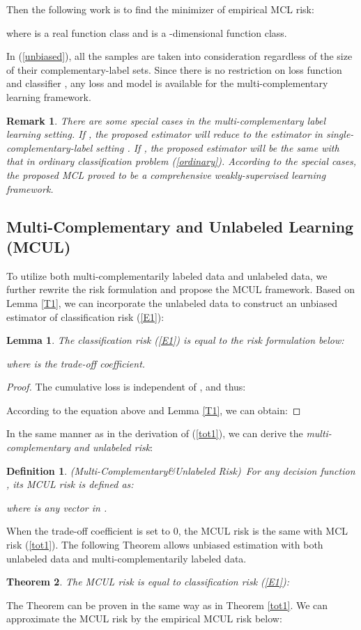 \documentclass[]{article} \usepackage{geometry}
\newtheorem{definition}{Definition}
\newtheorem{theorem}{Theorem}
\newtheorem{remark}{Remark}
\newtheorem{lemma}[theorem]{Lemma}
\begin{document}
Then the following work is to find the minimizer  of empirical MCL risk:

where  is a real function class and  is a -dimensional function class.

In (\ref{unbiased}), all the samples are taken into consideration regardless of the size of their complementary-label sets. Since there is no restriction on loss function  and classifier , any loss and model is available for the multi-complementary learning framework.

\begin{remark}{\rm
There are some special cases in the multi-complementary label learning setting. If , the proposed estimator will reduce to the estimator in single-complementary-label setting \cite{DBLP:conf/icml/IshidaNMS19}. If , the proposed estimator will be the same with that in ordinary classification problem (\ref{ordinary}). According to the special cases, the proposed MCL proved to be a comprehensive weakly-supervised learning framework.}
\end{remark}
\subsection{Multi-Complementary and Unlabeled Learning (MCUL)}
To utilize both multi-complementarily labeled data and unlabeled data, we further rewrite the risk formulation and propose the MCUL framework. Based on Lemma \ref{T1}, we can incorporate the unlabeled data to construct an unbiased estimator of classification risk (\ref{E1}):
\begin{lemma}
\label{T2}
The classification risk (\ref{E1}) is equal to the risk formulation below:

where  is the trade-off coefficient.
\end{lemma}
\begin{proof}
The cumulative loss  is independent of , and thus:

According to the equation above and Lemma \ref{T1}, we can obtain:
\end{proof}
In the same manner as in the derivation of (\ref{tot1}), we can derive the \textit{multi-complementary and unlabeled risk}:
\begin{definition}(Multi-Complementary\&Unlabeled Risk)~For any decision function , its MCUL risk is defined as:
\label{D2}

where  is any vector in .
\end{definition}
When the trade-off coefficient  is set to 0, the MCUL risk is the same with MCL risk (\ref{tot1}). The following Theorem allows unbiased estimation with both unlabeled data and multi-complementarily labeled data.
\begin{theorem}
The MCUL risk is equal to classification risk (\ref{E1}):
    
\end{theorem}
The Theorem can be proven in the same way as in Theorem \ref{tot1}.
We can approximate the MCUL risk by the empirical MCUL risk below:
\end{document}
